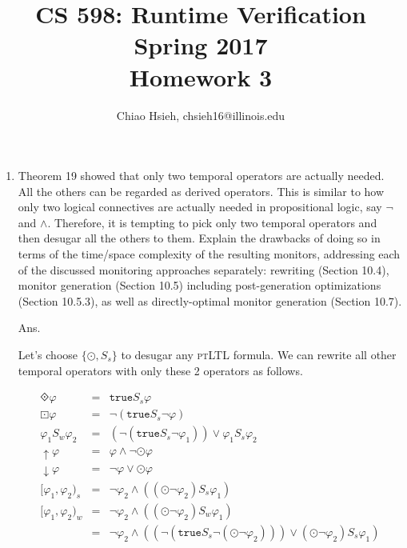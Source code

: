 \documentclass{article}
\title{\Large\bfseries CS 598: Runtime Verification \\
Spring 2017 \\
Homework 3}
\author{Chiao Hsieh, chsieh16@illinois.edu}
\begin{document}
\maketitle

\newcommand{\ptLTL}{\textsc{ptLTL}\xspace}
\newcommand{\BigO}{\ensuremath{\mathcal{O}}\xspace}

\newcommand{\TT}{\texttt{true}\xspace}
\newcommand{\FF}{\texttt{false}\xspace}
\newcommand{\Prev}{\ensuremath{\odot}\xspace}
\newcommand{\Since}{\ensuremath{S_s}\xspace}
\newcommand{\PastF}{\ensuremath{\diamondcdot}\xspace}
\newcommand{\PastG}{\ensuremath{\boxdot}\xspace}

\begin{enumerate}
\item Theorem 19 showed that only two temporal operators are actually needed.
All the others can be regarded as derived operators.
This is similar to how only two logical connectives are actually needed in 
propositional logic, say $\neg$ and $\land$.
Therefore, it is tempting to pick only two temporal operators and then desugar
all the others to them.
Explain the drawbacks of doing so in terms of the time/space complexity of the
resulting monitors,
addressing each of the discussed monitoring approaches separately:
rewriting (Section 10.4), monitor generation (Section 10.5) including
post-generation optimizations (Section 10.5.3),
as well as directly-optimal monitor generation (Section 10.7).

Ans.

Let's choose $\{\Prev, \Since\}$ to desugar any \ptLTL formula.
We can rewrite all other temporal operators with only these 2 operators as follows.

\[
\begin{array}{lll}
	\PastF \varphi                   & = & \TT \Since \varphi                                                 \\
	\PastG \varphi                   & = & \neg (\TT \Since \neg \varphi)                                     \\
	\varphi_1 S_w \varphi_2          & = & (\neg (\TT \Since \neg \varphi_1)) \lor \varphi_1 \Since \varphi_2 \\
	\uparrow \varphi                 & = & \varphi \land \neg \Prev \varphi                                   \\
	\downarrow \varphi               & = & \neg \varphi \lor \Prev \varphi                                    \\
	\lbrack \varphi_1, \varphi_2 )_s & = & \neg \varphi_2 \land ((\Prev \neg \varphi_2) \Since \varphi_1)     \\
	\lbrack \varphi_1, \varphi_2 )_w & = & \neg \varphi_2 \land ((\Prev \neg \varphi_2) S_w \varphi_1)        \\
	                                 & = & \neg \varphi_2 \land ((\neg (\TT \Since \neg (\Prev \neg \varphi_2))) \lor (\Prev \neg \varphi_2) \Since \varphi_1)        \\
\end{array}
\]


\end{enumerate}
\end{document}
